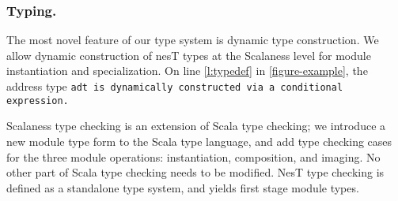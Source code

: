 \subsubsection{Typing.} 

The most novel feature of our type system is dynamic type
construction. We allow dynamic construction of nesT types at the
Scalaness level for module instantiation and specialization.  On line
\ref{l:typedef} in \autoref{figure-example}, the address type \tt{adt}
is dynamically constructed via a conditional expression.

Scalaness type checking is an extension of Scala type checking; we
introduce a new module type form to the Scala type language, and add
type checking cases for the three module operations: instantiation,
composition, and imaging. No other part of Scala type checking needs
to be modified.  NesT type checking is defined as a standalone type system, and
yields first stage module types.

%



